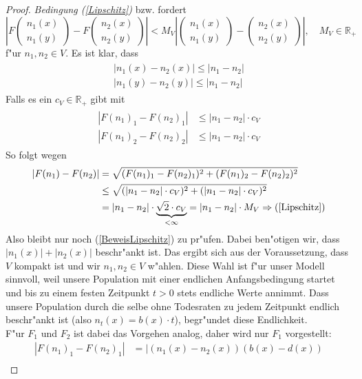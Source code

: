\documentclass[11pt, a4paper, german]{article}
\theoremstyle{plain}
\newcommand{\tvec}[2]{\begin{pmatrix}#1\\#2\end{pmatrix}}
\begin{document}
\begin{proof}
		\textit{Bedingung (\ref{Lipschitz})} bzw. \cite[Kapitel 11 - \textbf{Thm 2.1} (2.7)]{ethier2009markov} fordert
		\[ \left| F\tvec{n_1(x)}{n_1(y)} - F\tvec{n_2(x)}{n_2(y)} \right| < M_V \left| \tvec{n_1(x)}{n_1(y)} - \tvec{n_2(x)}{n_2(y)} \right|, \quad M_V \in \mathbb{R}_{+} \]
		f"ur $ n_1, n_2 \in V $. Es ist klar, dass
		\begin{align}
		\begin{split}
			|n_1(x) - n_2(x)| \le |n_1 - n_2|\\
			|n_1(y) - n_2(y)| \le |n_1 - n_2| \label{epsAbsch}
		\end{split}
		\end{align}
		Falls es ein $ c_V \in \mathbb{R}_{+} $ gibt mit
		\begin{align}
		\begin{split}
			|F(n_1)_1 - F(n_2)_1| &\le |n_1 - n_2| \cdot c_V\\
			|F(n_1)_2 - F(n_2)_2| &\le |n_1 - n_2| \cdot c_V \label{BeweisLipschitz}
		\end{split}
		\end{align}
		So folgt wegen 
		\begin{align}
		\begin{split}
			|F(n_1) - F(n_2)| &= \sqrt{(F(n_1)_1 - F(n_2)_1)^2 + (F(n_1)_2 - F(n_2)_2)^2}\\
			&\le \sqrt{(|n_1 - n_2| \cdot c_V)^2 + (|n_1 - n_2| \cdot c_V)^2}\\
			&= |n_1 - n_2| \cdot \underbrace{\sqrt{2} \cdot c_V}_{< \infty} = |n_1 - n_2| \cdot M_V \Rightarrow (\ref{Lipschitz})
			\label{epsBehauptung}
		\end{split}
		\end{align}
		Also bleibt nur noch (\ref{BeweisLipschitz}) zu pr"ufen. Dabei ben"otigen wir, dass $ |n_1(x)| + |n_2(x)| $ beschr"ankt ist. Das ergibt sich aus der Voraussetzung, dass $ V $ kompakt ist und wir $ n_1, n_2 \in V $ w"ahlen. Diese Wahl ist f"ur unser Modell sinnvoll, weil unsere Population mit einer endlichen Anfangsbedingung startet und bis zu einem festen Zeitpunkt $ t > 0 $ stets endliche Werte annimmt. Dass unsere Population durch die selbe ohne Todesraten zu jedem Zeitpunkt endlich beschr"ankt ist (also $ n_t(x) = b(x) \cdot t $), begr"undet diese Endlichkeit.\\
		F"ur $ F_1 $ und $ F_2 $ ist dabei das Vorgehen analog, daher wird nur $ F_1 $ vorgestellt:\\
		\begin{align*}
			|F(n_1)_1 - F(n_2)_1| & = |(n_1(x) - n_2(x))(b(x) - d(x)) \\

\end{align*}
\end{proof}
\end{document}
